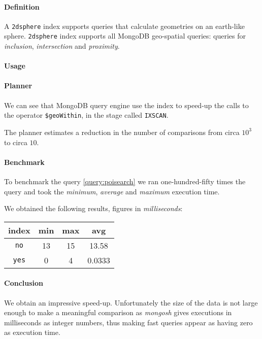 \paragraph{Definition}
A \texttt{2dsphere} index supports queries that calculate geometries on an
earth-like sphere. \texttt{2dsphere} index supports all MongoDB geo-spatial
queries: queries for \textit{inclusion}, \textit{intersection} and
\textit{proximity}.

\paragraph{Usage}

\paragraph{Planner}
We can see that MongoDB query engine use the index to speed-up the calls to the
operator \texttt{\$geoWithin}, in the stage called \texttt{IXSCAN}.

The planner estimates a reduction in the number of comparisons from circa
$10^3$ to circa $10$.



\paragraph{Benchmark}
To benchmark the query \ref{query:poisearch} we ran one-hundred-fifty times the
query
and took the \textit{minimum}, \textit{average} and \textit{maximum} execution
time.



We obtained the following results, figures in \textit{milliseconds}:

\begin{tabular}{|c|c|c|c|}
	\hline
	index & min & max & avg \\
	\hline
	\hline
	\texttt{no} & 13 & 15 & 13.58 \\
	\hline
	\texttt{yes} & 0 & 4 & 0.0333 \\
	\hline
\end{tabular}

\paragraph{Conclusion}
We obtain an impressive speed-up. Unfortunately the size of the data is not
large enough to make a meaningful comparison as \textit{mongosh} gives
executions in milliseconds as integer numbers, thus making fast queries appear
as having zero as execution time.
